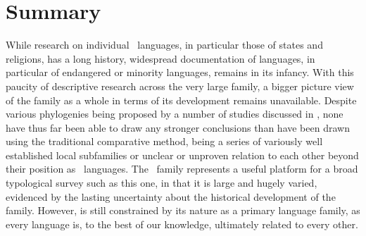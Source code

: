 \section{Summary}
While research on individual \lfam\ languages, in particular those of states and religions, has a long history, widespread documentation of languages, in particular of endangered or minority languages, remains in its infancy. With this paucity of descriptive research across the very large family, a bigger picture view of the family as a whole in terms of its development remains unavailable. Despite various phylogenies being proposed by a number of studies discussed in , none have thus far been able to draw any stronger conclusions than have been drawn using the traditional comparative method, being a series of variously well established local subfamilies or unclear or unproven relation to each other beyond their position as \lfam\ languages. The \lfam\ family represents a useful platform for a broad typological survey such as this one, in that it is large and hugely varied, evidenced by the lasting uncertainty about the historical development of the family. However, is still constrained by its nature as a primary language family, as every language is, to the best of our knowledge, ultimately related to every other.